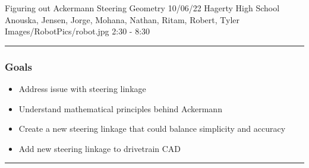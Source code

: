 \insertmeeting 
	{Figuring out Ackermann Steering Geometry} 
	{10/06/22} 
	{Hagerty High School}
	{Anouska, Jensen, Jorge, Mohana, Nathan, Ritam, Robert, Tyler}
	{Images/RobotPics/robot.jpg}
	{2:30 - 8:30}
	
\noindent\hfil\rule{\textwidth}{.4pt}\hfil
\subsubsection*{Goals}
\begin{itemize}
    \item Address issue with steering linkage
    \item Understand mathematical principles behind Ackermann
    \item Create a new steering linkage that could balance simplicity and accuracy
    \item Add new steering linkage to drivetrain CAD




\end{itemize} 

\noindent\hfil\rule{\textwidth}{.4pt}\hfil

